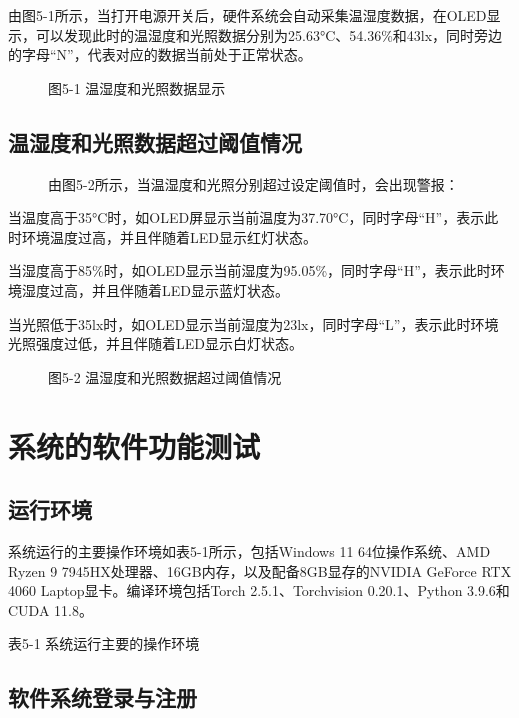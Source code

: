 \documentclass[12pt, a4paper, twoside]{ctexart}
\begin{document}
由图5-1所示，当打开电源开关后，硬件系统会自动采集温湿度数据，在OLED显示，可以发现此时的温湿度和光照数据分别为25.63°C、54.36\%和43lx，同时旁边的字母“N”，代表对应的数据当前处于正常状态。


\begin{figure}[htbp]
\centering
\caption{图5-1 温湿度和光照数据显示}
\end{figure}


\subsection{温湿度和光照数据超过阈值情况}


\begin{figure}[htbp]
\centering
\caption{由图5-2所示，当温湿度和光照分别超过设定阈值时，会出现警报：}
\end{figure}

当温度高于35°C时，如OLED屏显示当前温度为37.70°C，同时字母“H”，表示此时环境温度过高，并且伴随着LED显示红灯状态。

当湿度高于85\%时，如OLED显示当前湿度为95.05\%，同时字母“H”，表示此时环境湿度过高，并且伴随着LED显示蓝灯状态。

当光照低于35lx时，如OLED显示当前湿度为23lx，同时字母“L”，表示此时环境光照强度过低，并且伴随着LED显示白灯状态。


\begin{figure}[htbp]
\centering
\caption{图5-2 温湿度和光照数据超过阈值情况}
\end{figure}


\section{系统的软件功能测试}


\subsection{运行环境}

系统运行的主要操作环境如表5-1所示，包括Windows 11 64位操作系统、AMD Ryzen 9 7945HX处理器、16GB内存，以及配备8GB显存的NVIDIA GeForce RTX 4060 Laptop显卡。编译环境包括Torch 2.5.1、Torchvision 0.20.1、Python 3.9.6和CUDA 11.8。

表5-1 系统运行主要的操作环境


\subsection{软件系统登录与注册}
\end{document}

